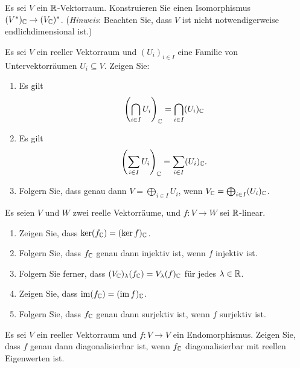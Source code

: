 \documentclass[a4paper,10pt]{scrartcl}
\begin{document}
\begin{question}
  Es sei $V$ ein $\mathbb{R}$-Vektorraum.
  Konstruieren Sie einen Isomorphismus $(V^*)_{\mathbb{C}} \to (V_{\mathbb{C}})^*$.
  (\emph{Hinweis}: Beachten Sie, dass $V$ ist nicht notwendigerweise endlichdimensional ist.)
\end{question}


\begin{question}
  Es sei $V$ ein reeller Vektorraum und $(U_i)_{i \in I}$ eine Familie von Untervektorräumen $U_i \subseteq V$.
  Zeigen Sie:
  \begin{enumerate}[leftmargin=*]
    \item
      Es gilt
      \[
          \left( \bigcap_{i \in I} U_i \right)_{\mathbb{C}}
        = \bigcap_{i \in I} (U_i)_{\mathbb{C}}
      \]
    \item
      Es gilt
      \[
          \left( \sum_{i \in I} U_i \right)_{\mathbb{C}}
        = \sum_{i \in I} (U_i)_{\mathbb{C}}.
      \]
    \item
      Folgern Sie, dass genau dann $V = \bigoplus_{i \in I} U_i$, wenn $V_{\mathbb{C}} = \bigoplus_{i \in I} (U_i)_{\mathbb{C}}$.
  \end{enumerate}
\end{question}


\begin{question}
  Es seien $V$ und $W$ zwei reelle Vektorräume, und $f \colon V \to W$ sei $\mathbb{R}$-linear.
  \begin{enumerate}[leftmargin=*]
    \item
      Zeigen Sie, dass $\ker (f_{\mathbb{C}}) = (\ker f)_{\mathbb{C}}$.
    \item
      Folgern Sie, dass $f_{\mathbb{C}}$ genau dann injektiv ist, wenn $f$ injektiv ist.
    \item
      Folgern Sie ferner, dass $(V_{\mathbb{C}})_\lambda(f_{\mathbb{C}}) = V_\lambda(f)_{\mathbb{C}}$ für jedes $\lambda \in \mathbb{R}$.
    \item
      Zeigen Sie, dass $\operatorname{im} (f_{\mathbb{C}}) = (\operatorname{im} f)_{\mathbb{C}}$.
    \item
      Folgern Sie, dass $f_{\mathbb{C}}$ genau dann surjektiv ist, wenn $f$ surjektiv ist.
  \end{enumerate}
\end{question}


\begin{question}
  Es sei $V$ ein reeller Vektorraum und $f \colon V \to V$ ein Endomorphismus.
  Zeigen Sie, dass $f$ genau dann diagonalisierbar ist, wenn $f_{\mathbb{C}}$ diagonalisierbar mit reellen Eigenwerten ist.
\end{question}
\end{document}
